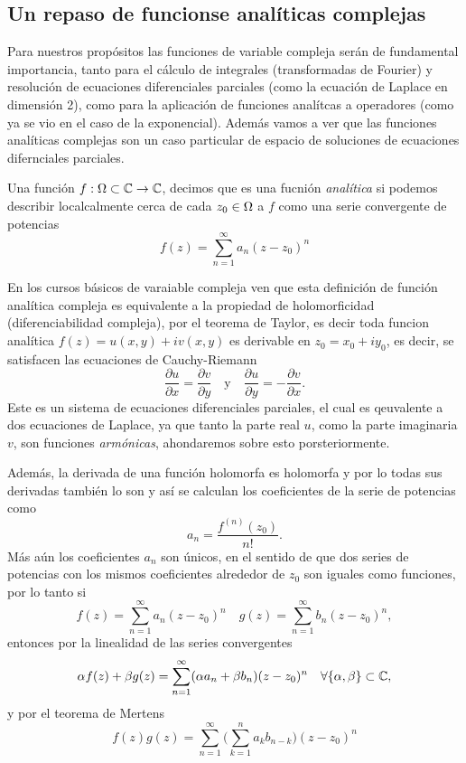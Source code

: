 \documentclass[main.tex]{subfiles}
\begin{document}
\subsection{Un repaso de funcionse analíticas complejas}
\noindent Para nuestros propósitos las funciones de variable compleja serán de fundamental importancia, tanto para el cálculo de integrales (transformadas de Fourier) y resolución de ecuaciones diferenciales parciales (como la ecuación de Laplace en dimensión 2), como para la aplicación de funciones analítcas a operadores (como ya se vio en el caso de la exponencial). Además vamos a ver que las funciones analíticas complejas son un caso particular de espacio de soluciones de ecuaciones difernciales parciales.
\begin{def.}
Una función \(f:\Omega\subset\mathbb C \to\mathbb C \), decimos que es una fucnión \emph{analítica} si podemos describir localcalmente cerca de cada \(z_0\in\Omega\) a \(f\) como una serie convergente de potencias
\[
f(z)=\sum_{n=1}^{\infty}a_n(z-z_0)^n
\]
\end{def.}
En los cursos básicos de varaiable compleja ven que esta definición de función analítica compleja es equivalente a la propiedad de holomorficidad (diferenciabilidad compleja), por el teorema de Taylor, es decir toda funcion analítica \(f(z) = u(x, y) + iv(x, y)\) es derivable en \(z_0 = x_0 + iy_0\), es  decir, se satisfacen las ecuaciones de Cauchy-Riemann
\[
\frac{\partial u}{\partial x} = \frac{\partial v}{\partial y} \quad \text{y} \quad \frac{\partial u}{\partial y} = -\frac{\partial v}{\partial x}.
\]
\noindent Este es un sistema de ecuaciones diferenciales parciales, el cual es qeuvalente a dos ecuaciones de Laplace, ya que tanto la parte real \(u\), como la parte imaginaria \(v\), son funciones \emph{armónicas}, ahondaremos sobre esto porsteriormente.

Además, la derivada de una función holomorfa es holomorfa y por lo todas sus derivadas también lo son y así se calculan los coeficientes de la serie de potencias como
\[
a_n = \frac{f^{(n)}(z_0)}{n!}.
\]
Más aún los coeficientes \(a_n\) son únicos, en el sentido de que dos series de potencias con los mismos coeficientes alrededor de \(z_0\) son iguales como funciones, por lo tanto si
\[
f(z)=\sum_{n=1}^{\infty}a_n(z-z_0)^n\quad g(z)=\sum_{n=1}^{\infty}b_n(z-z_0)^n,
\]
entonces por la linealidad de las series convergentes
\[
\alpha f(z)+\beta g(z)=\sum_{n=1}^{\infty}(\alpha a_n+\beta b_n)(z-z_0)^n\quad\forall\{\alpha,\beta\}\subset\mathbb C ,
\]
y por el teorema de Mertens
\[
f(z)g(z)=\sum_{n=1}^{\infty}\Big( \sum_{k=1}^n a_k b_{n-k}\Big)(z-z_0)^n
\]
\end{document}
